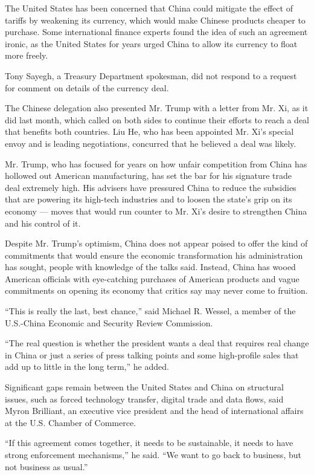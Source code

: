 The United States has been concerned that China could mitigate the
effect of tariffs by weakening its currency, which would make Chinese
products cheaper to purchase. Some international finance experts found
the idea of such an agreement ironic, as the United States for years
urged China to allow its currency to float more freely.

Tony Sayegh, a Treasury Department spokesman, did not respond to a
request for comment on details of the currency deal.

The Chinese delegation also presented Mr. Trump with a letter from Mr.
Xi, as it did last month, which called on both sides to continue their
efforts to reach a deal that benefits both countries. Liu He, who has
been appointed Mr. Xi's special envoy and is leading negotiations,
concurred that he believed a deal was likely.

Mr. Trump, who has focused for years on how unfair competition from
China has hollowed out American manufacturing, has set the bar for his
signature trade deal extremely high. His advisers have pressured China
to reduce the subsidies that are powering its high-tech industries and
to loosen the state's grip on its economy --- moves that would run
counter to Mr. Xi's desire to strengthen China and his control of it.

Despite Mr. Trump's optimism, China does not appear poised to offer the
kind of commitments that would ensure the economic transformation his
administration has sought, people with knowledge of the talks said.
Instead, China has wooed American officials with eye-catching purchases
of American products and vague commitments on opening its economy that
critics say may never come to fruition.

``This is really the last, best chance,'' said Michael R. Wessel, a
member of the U.S.-China Economic and Security Review Commission.

``The real question is whether the president wants a deal that requires
real change in China or just a series of press talking points and some
high-profile sales that add up to little in the long term,'' he added.

Significant gaps remain between the United States and China on
structural issues, such as forced technology transfer, digital trade and
data flows, said Myron Brilliant, an executive vice president and the
head of international affairs at the U.S. Chamber of Commerce.

``If this agreement comes together, it needs to be sustainable, it needs
to have strong enforcement mechanisms,'' he said. ``We want to go back
to business, but not business as usual.''

